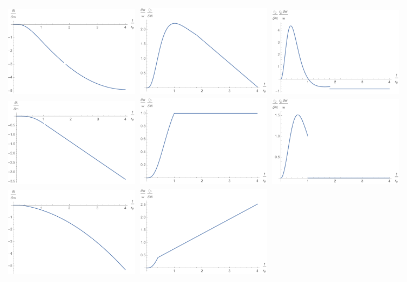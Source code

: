 \documentclass[aps,showpacs,onecolumn,floats,prd,superscriptaddress,nofootinbib]{revtex4}
\begin{document}
\begin{figure}[t]
\includegraphics[width=0.3\textwidth]{8x}
\includegraphics[width=0.3\textwidth]{8v}
\includegraphics[width=0.3\textwidth]{8a} \\
\includegraphics[width=0.3\textwidth]{5x}
\includegraphics[width=0.3\textwidth]{5v}
\includegraphics[width=0.3\textwidth]{5a} \\
\includegraphics[width=0.3\textwidth]{3x}
\includegraphics[width=0.3\textwidth]{3v}

\end{figure}
\end{document}
